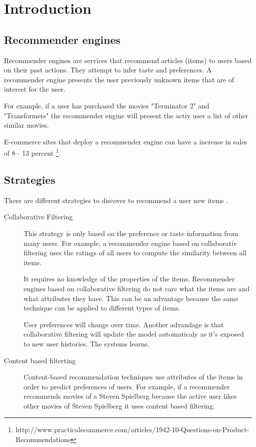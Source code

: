 \section{Introduction}
\label{sec:intro}

\subsection{Recommender engines}
\label{sec:recommenderengines}

Recommender engines are services that recommend articles (items) to users based on their past actions. They attempt to infer taste and preferences. A recommender engine presents the user previously unknown items that are of interest for the user. 

For example, if a user has purchased the movies "Terminator 2" and "Transformers" the recommender engine will present the activ user a list of other similar movies.

E-commerce sites that deploy a recommender engine can have a increase in sales of 8 - 13 percent \footnote{http://www.practicalecommerce.com/articles/1942-10-Questions-on-Product-Recommendations}.

\subsection{Strategies}
\label{sec:strategies}

There are different strategies to discover to recommend a user new items \cite{Owen}.
\begin{description}
\item[Collaborative Filtering] This strategy is only based on the preference or taste information from many users. For example, a recommender engine based on collaborativ filtering uses the ratings of all users to compute the similarity between all items. 

It requires no knowledge of the properties of the items. Recommender engines based on collaborative filtering do not care what the items are and what attributes they have. This can be an advantage because the same technique can be applied to different types of items. 

User preferences will change over time. Another advandage is that collaborative filtering will update the model automaticaly as it's exposed to new user histories. The systems learns.
\item[Content based filterting] Content-based recommendation techniques use attributes of the items in order to predict preferences of users. For example, if a recommender recommends movies of a Steven Spielberg because the active user likes other movies of Steven Spielberg it uses content based filtering.
\end{description}

